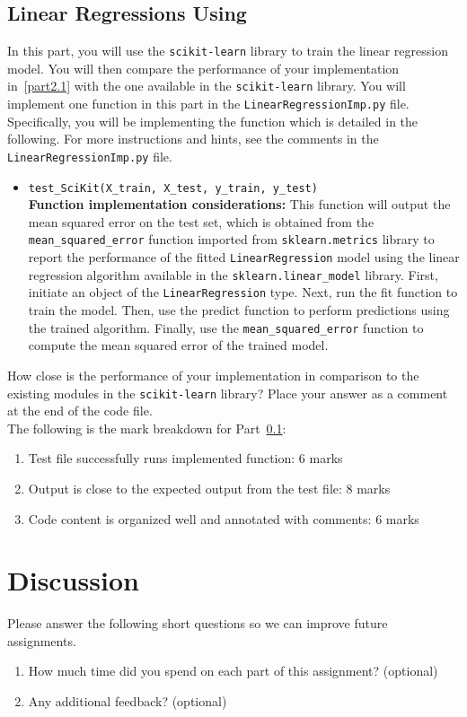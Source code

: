 \documentclass{article}
\theoremstyle{definition}
\begin{document}
\subsection{Linear Regressions Using } \label{part2.2}
In this part, you will use the \verb|scikit-learn| library to train the linear regression model. You will then
compare the performance of your implementation in~\ref{part2.1} with the one available in the \verb|scikit-learn|
library. You will implement one function in this part in the \verb|LinearRegressionImp.py| file. Specifically, you will be implementing the 
function which is detailed in the following. For more instructions and hints, see the comments in the \verb|LinearRegressionImp.py|
file.
\begin{itemize}
	\item{\verb|test_SciKit(X_train, X_test, y_train, y_test)|\\\textbf{Function implementation considerations:} This function will output the mean squared error on the test set, which is obtained from the \verb|mean_squared_error| function imported from \verb|sklearn.metrics| library to report the performance
		of the fitted \verb|LinearRegression| model using the linear regression algorithm available in the \verb|sklearn.linear_model|
		library.
		First, initiate an object of the \verb|LinearRegression| type. Next, run
		the fit function to train the model. Then, use the predict function to perform predictions
		using the trained algorithm. Finally, use the \verb|mean_squared_error| function to
		compute the mean squared error of the trained model.}
\end{itemize}
How close is the performance of your implementation in comparison to the existing modules in the
\verb|scikit-learn| library? Place your answer as a comment at the end of the code file.\\

The following is the mark breakdown for Part~\ref{part2.2}:
\begin{enumerate}[label=(\roman*)]
	\item Test file successfully runs implemented function: 6 marks
	\item Output is close to the expected output from the test file: 8 marks
	\item Code content is organized well and annotated with comments: 6 marks
\end{enumerate}
\section{Discussion}\label{disc}
Please answer the following short questions so we can improve future assignments.
\begin{enumerate}[label=\ref{disc}.\alph*)]
	\item How much time did you spend on each part of this assignment? (optional)
	\item Any additional feedback? (optional)
\end{enumerate}
\end{document}

